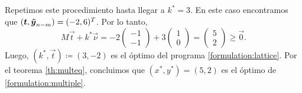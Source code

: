 \begin{example}
	Repetimos este procedimiento hasta llegar a $k^* = 3$. En este caso encontramos que $(\boldsymbol{t},
	\boldsymbol{\tilde{y}}_{n-m}) = (-2, 6)^T$. Por lo tanto,
	\begin{equation*}
		M\vec{t} + k^*\vec{\nu}
		= -2 \begin{pmatrix} -1 \\ -1 \end{pmatrix} + 3 \begin{pmatrix} 1 \\ 0 \end{pmatrix}
		= \begin{pmatrix} 5 \\ 2 \end{pmatrix} \geq \vec{0}.
	\end{equation*}
	Luego, $(k^*, \vec{t}) \coloneq (3, -2)$ es el óptimo del programa
	\eqref{formulation:lattice}. Por el teorema \ref{th:multeq}, concluimos que $(x^*, y^*) = (5,
	2)$ es el óptimo de \eqref{formulation:multiple}.
\end{example}
